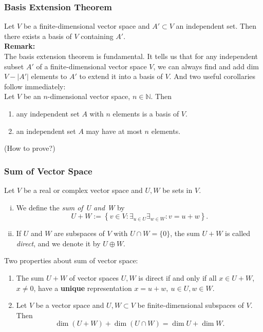 \documentclass{beamer}
\renewcommand{\emph}[1]{{\color{Turquoise3}\textsl{#1}}}
\newcommand{\N}{\mathbb{N}}
\newcommand{\nullspace}{~\\[15pt]}
\newcommand{\remark}{\textbf{Remark: }}
\begin{document}
\begin{frame}
    \frametitle{Basis Extension Theorem}
    Let $V$ be a finite-dimensional vector space and $A'\subset V$ an independent set. Then there exists a basis of $V$ containing $A'$.
    \nullspace
    \remark\\
    The basis extension theorem is fundamental. It tells us that for any independent subset $A'$ of a finite-dimensional vector space $V$, we can always find and add dim $V-|A'|$ elements to $A'$ to extend it into a basis of $V$. And two useful corollaries follow immediately:\nullspace
    Let $V$ be an $n$-dimensional vector space, $n\in\N$. Then\\
    \begin{enumerate}
        \item any independent set $A$ with $n$ elements is a basis of $V$.
        \item an independent set $A$ may have at most $n$ elements.
    \end{enumerate}
    (How to prove?)
\end{frame}

\begin{frame}
    \frametitle{Sum of Vector Space}
    Let $V$ be a real or complex vector space and $U,W$ be sets in $V$.
    \begin{enumerate}[(i)]
        \item We define the \emph{sum of U and W} by
              \[U+W:=\left\{v\in V:\mathop{\exists}_{u\in U}\mathop{\exists}_{w\in W}: v=u+w\right\}.\]
        \item If $U$ and $W$ are subspaces of $V$ with $U\cap W=\{0\}$, the sum $U+W$ is called \emph{direct}, and we denote it by $U\oplus W$.
    \end{enumerate}
    Two properties about sum of vector space:\\
    \begin{enumerate}
        \item The sum $U+W$ of vector spaces $U,W$ is direct if and only if all $x\in U+W$, $x\neq0$, have a \textbf{unique} representation $x=u+w,~u\in U,w\in W$.
        \item Let $V$ be a vector space and $U,W\subset V$ be finite-dimensional subspaces of $V$. Then
              \[\dim(U+W)+\dim(U\cap W)=\dim U+\dim W.\]
    \end{enumerate}
\end{frame}
\end{document}
